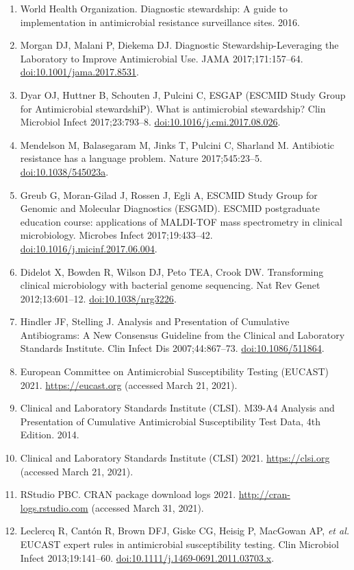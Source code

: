 \documentclass[
]{book}
\providecommand{\tightlist}{%
  \setlength{\itemsep}{0pt}\setlength{\parskip}{0pt}}
\begin{document}
\begin{enumerate}
\def\labelenumi{\arabic{enumi}.}
\tightlist
\item
  World Health Organization. Diagnostic stewardship: A guide to implementation in antimicrobial resistance surveillance sites. 2016.
\item
  Morgan DJ, Malani P, Diekema DJ. Diagnostic Stewardship-Leveraging the Laboratory to Improve Antimicrobial Use. JAMA 2017;171:157--64. \url{doi:10.1001/jama.2017.8531}.
\item
  Dyar OJ, Huttner B, Schouten J, Pulcini C, ESGAP (ESCMID Study Group for Antimicrobial stewardshiP). What is antimicrobial stewardship? Clin Microbiol Infect 2017;23:793--8. \url{doi:10.1016/j.cmi.2017.08.026}.
\item
  Mendelson M, Balasegaram M, Jinks T, Pulcini C, Sharland M. Antibiotic resistance has a language problem. Nature 2017;545:23--5. \url{doi:10.1038/545023a}.
\item
  Greub G, Moran-Gilad J, Rossen J, Egli A, ESCMID Study Group for Genomic and Molecular Diagnostics (ESGMD). ESCMID postgraduate education course: applications of MALDI-TOF mass spectrometry in clinical microbiology. Microbes Infect 2017;19:433--42. \url{doi:10.1016/j.micinf.2017.06.004}.
\item
  Didelot X, Bowden R, Wilson DJ, Peto TEA, Crook DW. Transforming clinical microbiology with bacterial genome sequencing. Nat Rev Genet 2012;13:601--12. \url{doi:10.1038/nrg3226}.
\item
  Hindler JF, Stelling J. Analysis and Presentation of Cumulative Antibiograms: A New Consensus Guideline from the Clinical and Laboratory Standards Institute. Clin Infect Dis 2007;44:867--73. \url{doi:10.1086/511864}.
\item
  European Committee on Antimicrobial Susceptibility Testing (EUCAST) 2021. \url{https://eucast.org} (accessed March 21, 2021).
\item
  Clinical and Laboratory Standards Institute (CLSI). M39-A4 Analysis and Presentation of Cumulative Antimicrobial Susceptibility Test Data, 4th Edition. 2014.
\item
  Clinical and Laboratory Standards Institute (CLSI) 2021. \url{https://clsi.org} (accessed March 21, 2021).
\item
  RStudio PBC. CRAN package download logs 2021. \url{http://cran-logs.rstudio.com} (accessed March 31, 2021).
\item
  Leclercq R, Cantón R, Brown DFJ, Giske CG, Heisig P, MacGowan AP, \emph{et al.} EUCAST expert rules in antimicrobial susceptibility testing. Clin Microbiol Infect 2013;19:141--60. \url{doi:10.1111/j.1469-0691.2011.03703.x}.

\end{enumerate}
\end{document}
